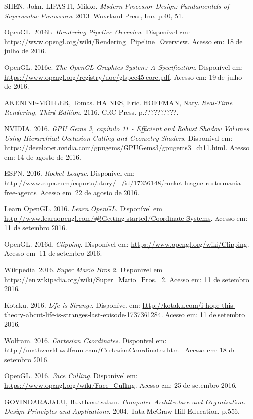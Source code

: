 \documentclass[brazil,ruledheader]{abntifes}
\begin{document}
\begin{thebibliography}{1}
SHEN, John. LIPASTI, Mikko. \textit{Modern Processor Design: Fundamentals of Superscalar Processors}. 2013. Waveland Press, Inc. p.40, 51.

OpenGL. 2016b. \textit{Rendering Pipeline Overview}. Disponível em: \url{https://www.opengl.org/wiki/Rendering_Pipeline_Overview}.
Acesso em: 18 de julho de 2016.

OpenGL. 2016c. \textit{The OpenGL Graphics System:
A Specification}. Disponível em: \url{https://www.opengl.org/registry/doc/glspec45.core.pdf}.
Acesso em: 19 de julho de 2016.

AKENINE-MÖLLER, Tomas. HAINES, Eric. HOFFMAN, Naty. \textit{Real-Time Rendering, Third Edition}. 2016. CRC Press. p.??????????.

NVIDIA. 2016. \textit{GPU Gems 3, capítulo 11 - Efficient and Robust Shadow Volumes Using Hierarchical Occlusion Culling and Geometry Shaders}. Disponível em: \url{https://developer.nvidia.com/gpugems/GPUGems3/gpugems3_ch11.html}.
Acesso em: 14 de agosto de 2016.

ESPN. 2016. \textit{Rocket League}. Disponível em: \url{http://www.espn.com/esports/story/_/id/17356148/rocket-league-rostermania-free-agents}.
Acesso em: 22 de agosto de 2016.

Learn OpenGL. 2016. \textit{Learn OpenGL}. Disponível em: \url{http://www.learnopengl.com/#!Getting-started/Coordinate-Systems}.
Acesso em: 11 de setembro 2016.

OpenGL. 2016d. \textit{Clipping}. Disponível em: \url{https://www.opengl.org/wiki/Clipping}.
Acesso em: 11 de setembro 2016.

Wikipédia. 2016. \textit{Super Mario Bros 2}. Disponível em: \url{https://en.wikipedia.org/wiki/Super_Mario_Bros._2}.
Acesso em: 11 de setembro 2016.

Kotaku. 2016. \textit{Life is Strange}. Disponível em: \url{http://kotaku.com/i-hope-this-theory-about-life-is-stranges-last-episode-1737361284}.
Acesso em: 11 de setembro 2016.

Wolfram. 2016. \textit{Cartesian Coordinates}. Disponível em: \url{http://mathworld.wolfram.com/CartesianCoordinates.html}.
Acesso em: 18 de setembro 2016.

OpenGL. 2016. \textit{Face Culling}. Disponível em: \url{https://www.opengl.org/wiki/Face_Culling}.
Acesso em: 25 de setembro 2016.

GOVINDARAJALU, Bakthavatsalam. \textit{Computer Architecture and Organization: Design Principles and Applications}. 2004. Tata McGraw-Hill Education. p.556.


\end{thebibliography}


\anexo
\end{document}
